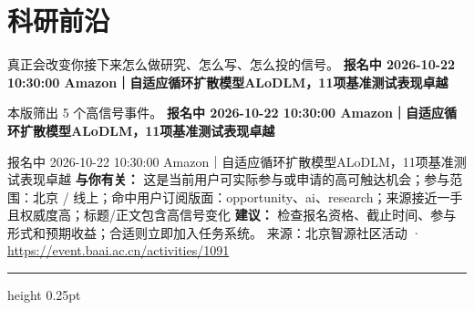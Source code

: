 \documentclass[10.5pt]{ctexart}
\begin{document}
\section*{科研前沿}
{\color{ormuted} 真正会改变你接下来怎么做研究、怎么写、怎么投的信号。}
\vspace{2mm}
{\LARGE\bfseries 报名中 2026-10-22 10:30:00 Amazon｜自适应循环扩散模型ALoDLM，11项基准测试表现卓越}\par
\vspace{1mm}
{\color{ormuted} 本版筛出 5 个高信号事件。}
\vspace{3mm}
{\Large\bfseries 报名中 2026-10-22 10:30:00 Amazon｜自适应循环扩散模型ALoDLM，11项基准测试表现卓越}\par
报名中 2026-10-22 10:30:00 Amazon｜自适应循环扩散模型ALoDLM，11项基准测试表现卓越
\textbf{与你有关：} 这是当前用户可实际参与或申请的高可触达机会；参与范围：北京 / 线上；命中用户订阅版面：opportunity、ai、research；来源接近一手且权威度高；标题/正文包含高信号变化
\textbf{建议：} 检查报名资格、截止时间、参与形式和预期收益；合适则立即加入任务系统。
{\footnotesize\color{ormuted} 来源：北京智源社区活动 · \url{https://event.baai.ac.cn/activities/1091}}
\vspace{4mm}
\hrule height 0.25pt
\vspace{3mm}
\end{document}
